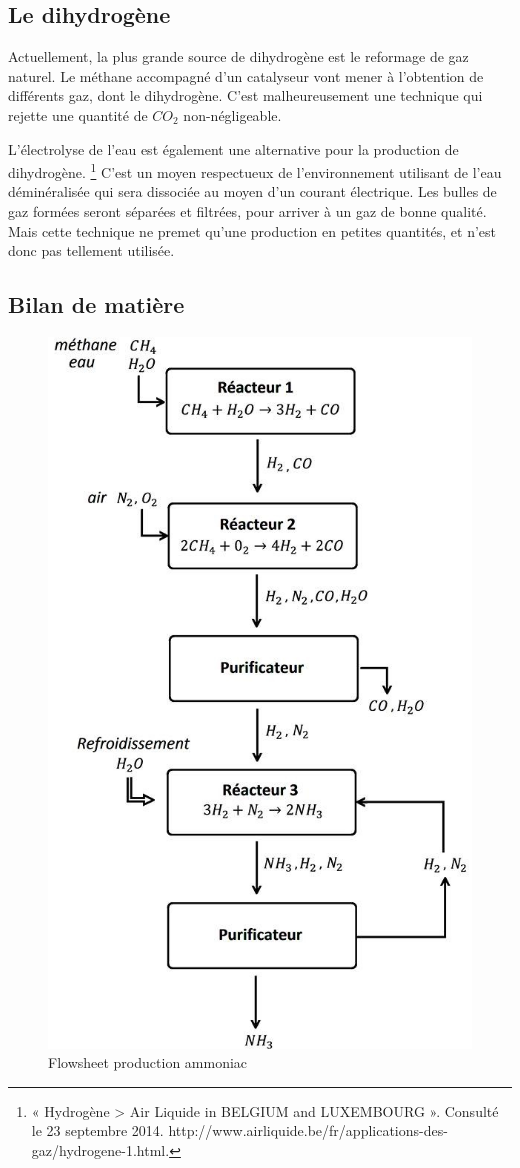 \documentclass[11pt,a4paper]{report}
\begin{document}
\subsection*{Le dihydrogène}
Actuellement, la plus grande source de dihydrogène est le reformage de gaz naturel. Le méthane accompagné d'un 
catalyseur vont mener à l'obtention de différents gaz, dont le dihydrogène. C'est malheureusement une technique
qui rejette une quantité de $CO_2$ non-négligeable.

L'électrolyse de l'eau est également une alternative pour la production de dihydrogène. \footnote{« Hydrogène > Air Liquide in BELGIUM and LUXEMBOURG ». Consulté le 23 septembre 2014. http://www.airliquide.be/fr/applications-des-gaz/hydrogene-1.html.}
C'est un moyen respectueux de l'environnement utilisant de l'eau déminéralisée qui sera dissociée au moyen 
d'un courant électrique. Les bulles de gaz formées seront séparées et filtrées, pour arriver à un gaz de bonne qualité.
Mais cette technique ne premet qu'une production en petites quantités, et n'est donc pas tellement utilisée.

\subsection*{Bilan de matière}
\begin{figure}[ht!]
 \centering
 \includegraphics[scale=0.35]{flowsheet.jpg}
 \caption{Flowsheet production ammoniac}
 \label{scheme}
 
\end{figure}
\end{document}
